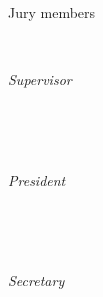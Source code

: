 \begin{titlepage}
	\tgherosfont
	\centering

	{ \Large \thesisUniversity } \\[4mm]
	\textsf{\thesisUniversityDepartment} \\
	\textsf{\thesisUniversityInstitute} \\

	\vfill
	{ \large \thesisSubject } \\[5mm]
	{ \LARGE \color{ctcolortitle} \textbf{\thesisTitle} \\[10mm] }
	{ \Large \thesisName } \\

	\vfill
  \begin{minipage}[t]{.27\textwidth}
    \raggedleft \hfill
  \end{minipage}
  \hspace*{15pt}
  \begin{minipage}[t]{.65\textwidth}
    { \small Jury members }
  \end{minipage} \\[3mm]
	\begin{minipage}[t]{.27\textwidth}
		\raggedleft
		\textit{Supervisor}
	\end{minipage}
	\hspace*{15pt}
	\begin{minipage}[t]{.65\textwidth}
		{ \Large \thesisFirstSupervisor } \\
    { \small \thesisFirstSupervisorUniversity }
	\end{minipage} \\[3mm]
	\begin{minipage}[t]{.27\textwidth}
		\raggedleft
		\textit{President}
	\end{minipage}
	\hspace*{15pt}
	\begin{minipage}[t]{.65\textwidth}
		{ \Large \thesisFirstReviewer } \\
	  { \small \thesisFirstReviewerUniversity }
	\end{minipage} \\[3mm]
	\begin{minipage}[t]{.27\textwidth}
		\raggedleft
		\textit{Secretary}
	\end{minipage}
	\hspace*{15pt}
	\begin{minipage}[t]{.65\textwidth}
		{ \Large \thesisSecondReviewer } \\

\end{minipage}
\end{titlepage}
